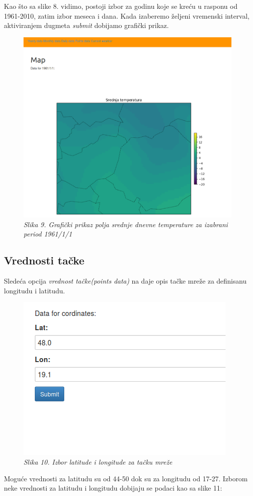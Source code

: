 \documentclass[12pt]{article}
\begin{document}
Kao što sa slike 8. vidimo, postoji izbor za godinu koje se kreću u rasponu od 1961-2010, zatim izbor meseca i dana. Kada izaberemo željeni vremenski interval, aktiviranjem dugmeta \textit{submit} dobijamo grafički prikaz. 

\begin{figure}[!htb]
	\centering
	\includegraphics[width=0.6\linewidth]{mapa.png}
	\caption*{\textsl{Slika 9. Grafički prikaz polja srednje dnevne temperature za izabrani period 1961/1/1}}
\end{figure}

\subsection{Vrednosti tačke}
Sledeća opcija \textit{vrednost tačke(points data)} na daje opis tačke mreže za definisanu longitudu i latitudu. 

\begin{figure}[!htb]
	\centering
	\includegraphics[width=0.7\linewidth]{points.png}
	\caption*{\textsl{Slika 10. Izbor latitude i longitude za tačku mreže}}
\end{figure}

Moguće vrednosti za latitudu su od 44-50 dok su za longitudu od 17-27. Izborom neke vrednosti za latitudu i longitudu dobijaju se podaci kao sa slike 11:
\end{document}
